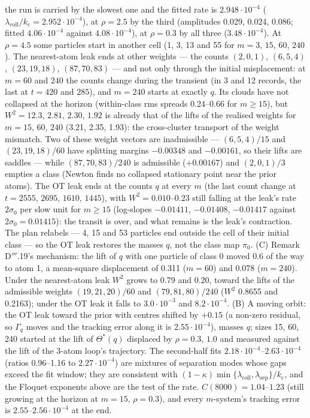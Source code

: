 the run is carried by the slowest one and the fitted rate is $2.948\cdot10^{-4}$
($\lambda_{\mathrm{coll}}/k_e = 2.952\cdot10^{-4}$), at $\rho = 2.5$ by the third (amplitudes 0.029, 0.024, 0.086;
fitted $4.06\cdot10^{-4}$ against $4.08\cdot10^{-4}$), at $\rho = 0.3$ by all three ($3.48\cdot10^{-4}$). At
$\rho = 4.5$ some particles start in another cell (1, 3, 13 and 55 for $m = 3$, $15$, $60$, $240$). The nearest-atom
leak ends at other weights --- the counts $(2,0,1)$, $(6,5,4)$, $(23,19,18)$, $(87,70,83)$ --- and not only through
the initial misplacement: at $m = 60$ and $240$ the counts change during the transient (in 3 and 12 records, the last
at $t = 420$ and $285$), and $m = 240$ starts at exactly $q$. Its clouds have not collapsed at the horizon
(within-class rms spreads 0.24--0.66 for $m\ge15$), but $W^2 = 12.3$, $2.81$, $2.30$, $1.92$ is already that of the
lifts of the realised weights for $m = 15$, $60$, $240$ (3.21, 2.35, 1.93): the cross-cluster transport of the weight
mismatch. Two of these weight vectors are inadmissible --- $(6,5,4)/15$ and $(23,19,18)/60$ have splitting margins
$-0.00348$ and $-0.00161$, so their lifts are saddles --- while $(87,70,83)/240$ is admissible ($+0.00167$) and
$(2,0,1)/3$ empties a class (Newton finds no collapsed stationary point near the prior atoms). The OT leak ends at the
counts $q$ at every $m$ (the last count change at $t = 2555$, $2695$, $1610$, $1445$), with $W^2 = 0.010$--$0.23$
still falling at the leak's rate $2\sigma_0$ per slow unit for $m\ge15$ (log-slopes $-0.01411$, $-0.01408$,
$-0.01417$ against $2\sigma_0 = 0.01415$): the transit is over, and what remains is the leak's contraction. The plan
relabels --- 4, 15 and 53 particles end outside the cell of their initial class --- so the OT leak restores the
masses $q$, not the class map $\pi_0$. (C) Remark D$'''$.19's mechanism: the lift of $q$ with one particle of class 0
moved 0.6 of the way to atom 1, a mean-square displacement of 0.311 ($m = 60$) and 0.078 ($m = 240$). Under the
nearest-atom leak $W^2$ grows to 0.79 and 0.20, toward the lifts of the admissible weights $(19,21,20)/60$ and
$(79,81,80)/240$ ($W^2$ 0.8655 and 0.2163); under the OT leak it falls to $3.0\cdot10^{-3}$ and $8.2\cdot10^{-4}$.
(B) A moving orbit: the OT leak toward the prior with centres shifted by $+0.15$ (a non-zero residual, so $\Gamma_q$
moves and the tracking error along it is $2.55\cdot10^{-4}$), masses $q$; sizes 15, 60, 240 started at the lift of
$\Theta^*(q)$ displaced by $\rho = 0.3$, $1.0$ and measured against the lift of the 3-atom loop's trajectory. The
second-half fits $2.18\cdot10^{-4}$--$2.63\cdot10^{-4}$ (ratios 0.96--1.16 to $2.27\cdot10^{-4}$) are mixtures of
separation modes whose gaps exceed the fit window; they are consistent with
$(1 - \kappa)\min\{\lambda_{\mathrm{coll}},\lambda_{\mathrm{sep}}\}/k_e$, and the Floquet exponents above are the
test of the rate. $C(8000) = 1.04$--$1.23$ (still growing at the horizon at $m = 15$, $\rho = 0.3$), and every
$m$-system's tracking error is $2.55$--$2.56\cdot10^{-4}$ at the end.

